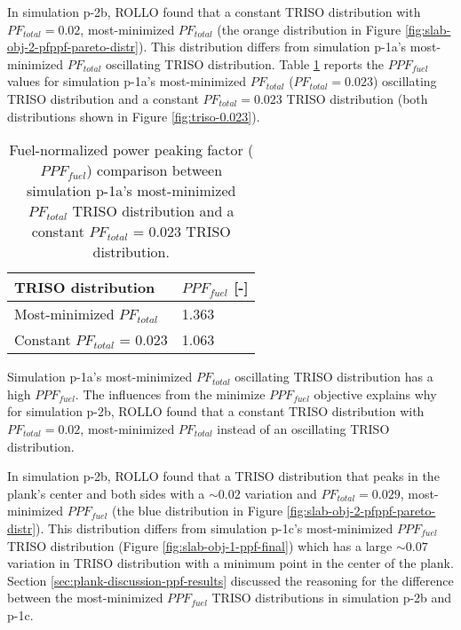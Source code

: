 In simulation p-2b, \gls{ROLLO} found that a constant TRISO distribution with 
$PF_{total} = 0.02$, most-minimized $PF_{total}$ (the orange distribution in Figure 
\ref{fig:slab-obj-2-pfppf-pareto-distr}). 
This distribution differs from simulation p-1a's most-minimized $PF_{total}$ oscillating 
TRISO distribution. 
Table \ref{tab:0.023-plank-ppf} reports the $PPF_{fuel}$ values for simulation p-1a's 
most-minimized $PF_{total}$ ($PF_{total} = 0.023$) oscillating TRISO distribution and 
a constant $PF_{total} = 0.023$ TRISO distribution (both distributions shown 
in Figure \ref{fig:triso-0.023}).
\begin{table}[htbp!]
    \centering
    \onehalfspacing
    \caption{Fuel-normalized power peaking factor ($PPF_{fuel}$) comparison between  
    simulation p-1a's most-minimized $PF_{total}$ TRISO distribution and a 
    constant $PF_{total}$ = 0.023 TRISO distribution.}
	\label{tab:0.023-plank-ppf}
    \footnotesize
    \begin{tabular}{ll}
    \hline
    \textbf{TRISO distribution} & \textbf{$PPF_{fuel}$ [-]} \\
    \hline 
    Most-minimized $PF_{total}$ & 1.363 \\
    Constant $PF_{total}$ = 0.023 & 1.063 \\
    \hline
    \end{tabular}
\end{table}

Simulation p-1a's most-minimized $PF_{total}$ oscillating TRISO distribution has a high 
$PPF_{fuel}$.
The influences from the minimize $PPF_{fuel}$ objective explains why for simulation p-2b, 
\gls{ROLLO} found that a constant TRISO distribution with $PF_{total} = 0.02$, 
most-minimized $PF_{total}$ instead of an oscillating TRISO distribution.

In simulation p-2b, \gls{ROLLO} found that a TRISO distribution that peaks in the 
plank's center and both sides with a $\sim0.02$ variation and $PF_{total}=0.029$, 
most-minimized $PPF_{fuel}$ (the blue distribution in Figure 
\ref{fig:slab-obj-2-pfppf-pareto-distr}). 
This distribution differs from simulation p-1c's most-minimized $PPF_{fuel}$ TRISO 
distribution (Figure \ref{fig:slab-obj-1-ppf-final}) which has a large $\sim 0.07$ 
variation in TRISO distribution with a minimum point in the center of the plank. 
Section \ref{sec:plank-discussion-ppf-results} discussed the reasoning for the 
difference between the most-minimized $PPF_{fuel}$ TRISO distributions in 
simulation p-2b and p-1c. 

